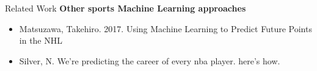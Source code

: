 \begin{frame}{Related Work}
    \textbf{Other sports Machine Learning approaches}
    \vspace{2em}
    \begin{itemize}
       \item Matsuzawa, Takehiro. 2017. Using Machine Learning to Predict Future Points in the NHL
       \item Silver, N. We’re predicting the career of every nba player. here’s how.
    \end{itemize}
\end{frame} 
